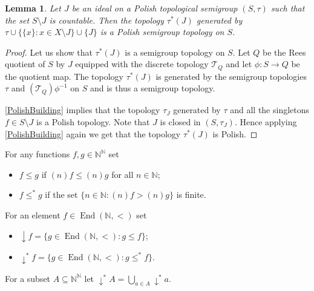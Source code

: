 \documentclass[11pt]{amsart}
\newtheorem{lemma}[theorem]{Lemma}
\theoremstyle{definition}
\newcommand{\N}{\mathbb N}
\newcommand{\Tau}{\mathcal T}
\newcommand{\End}{\operatorname{End}(\mathbb N, <)}
\begin{document}

\begin{lemma}\label{Pol2}
Let $J$ be an ideal on a Polish topological semigroup $(S,\tau)$ such that the set $S\setminus J$ is countable. Then the topology $\tau^*(J)$ generated by $\tau\cup\{\{x\}:x\in X\setminus J\}\cup\{J\}$ is a Polish semigroup topology on $S$.   
\end{lemma}

\begin{proof}
Let us show that $\tau^*(J)$ is a semigroup topology on $S$. 
Let \(Q\) be the Rees quotient of \(S\) by \(J\) equipped with the discrete topology \(\Tau_Q\) and let \(\phi:S\to Q\) be the quotient map. 
The topology $\tau^*(J)$ is generated by the semigroup topologies \(\tau\) and \((\Tau_Q)\phi^{-1}\) on \(S\) and is thus a semigroup topology.
 
\cref{PolishBuilding} implies that the topology  $\tau_J$ generated by $\tau$ and all the singletons $f\in S\setminus J$ is a Polish topology. Note that $J$ is closed in $(S,\tau_J)$.  Hence applying \cref{PolishBuilding} again we get that the topology $\tau^*(J)$ is Polish.
\end{proof}




For any functions $f,g\in \N^\N$ set
\begin{itemize}
    \item $f\leq g$ if $(n)f\leq (n)g$ for all $n\in\N$;
    \item $f\leq ^* g$ if the set $\{n\in\N: (n)f>(n)g\}$ is finite.
\end{itemize}

For an element $f\in \End$ set
\begin{itemize}
\item ${\downarrow}f=\{g\in \End: g\leq f\}$;
\item ${\downarrow}^*f=\{g\in \End: g\leq^* f\}$.
\end{itemize}
For a subset $A\subseteq \N^\N$ let ${\downarrow}^*A=\bigcup_{a\in A}{\downarrow}^*a$.
\end{document}
